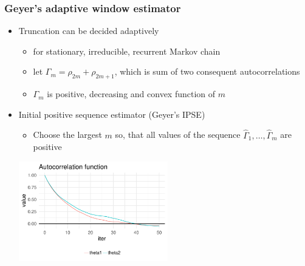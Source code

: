 \documentclass[10pt]{beamer}
\begin{document}
\begin{frame}

\frametitle{ Geyer's adaptive window estimator}

  \begin{itemize}
  \item Truncation can be decided adaptively
    \begin{itemize}
    \item for stationary, irreducible, recurrent Markov chain
    \item let $\Gamma_m=\rho_{2m}+\rho_{2m+1}$, which is sum of two
      consequent autocorrelations
    \item $\Gamma_m$ is positive, decreasing and convex function of $m$
    \end{itemize}
    \vspace{0.5\baselineskip}
  \item<2-> Initial positive sequence estimator (Geyer's IPSE)
      \begin{itemize}
        \item Choose the largest $m$ so, that all values of the sequence
        $\hat{\Gamma}_1, \ldots, \hat{\Gamma}_m$ are positive
      \end{itemize}
  \vspace{0.5\baselineskip}
      \includegraphics[width=6.5cm]{figs/Metrop1acf.pdf}
  \end{itemize}
\end{frame}

\end{document}
